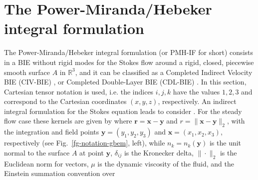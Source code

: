 \documentclass[oneside,onecolumn,10pt,final]{asme2ej}
\newcounter{tema}
\begin{document}
\section{The Power-Miranda/Hebeker integral formulation}
\label{subsec:power-miranda-hebeker-if}

\noindent
The Power-Miranda/Hebeker integral formulation (or PMH-IF
for short) consists in a BIE without rigid modes for the
Stokes flow around a rigid, closed, piecewise smooth surface
$A$ in $\mathbb{R}^3$, and it can be classified as a 
Completed Indirect Velocity BIE 
(CIV-BIE) \cite{rf:ingber1}, or Completed Double-Layer BIE
(CDL-BIE) \cite{rf:power-wrobel,rf:pozrikidis2}.
%
In this section, Cartesian tensor notation is used, i.e. the
indices $i,j,k$ have the values $1,2,3$ and correspond to the
Cartesian coordinates $(x,y,z)$, respectively.
%
An indirect integral formulation for the Stokes equation
leads to consider %
%
. 
%
For the steady flow case these kernels are given by %
\cite{rf:power-wrobel,rf:pozrikidis2}
%
%
where $\bm {r} = \bm {x} - \bm {y}$ 
and   $ r = \| \bm {x} - \bm {y} \|_2$, 
%
with the integration and field points $\bm{y}=(y_1,y_2,y_3)$ 
and $\bm{x}=(x_1,x_2,x_3)$, respectively
(see Fig.~\ref{fg-notation-gbem}, left),
%
while $n_k=n_k(\bm{y})$ is the unit normal
to the surface $A$ at point $\bm{y}$, 
%
$\delta_{ij}$ is the Kronecker delta,
$\|\cdot\|_2$ is the Euclidean norm for vectors, 
$\mu$ is the dynamic viscosity of the fluid,
and the Einstein summation convention over 
\end{document}
